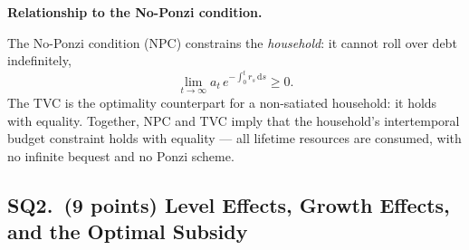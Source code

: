 \documentclass[a4paper,11pt]{article}
\newcommand{\dd}{\mathrm{d}}
\begin{document}
\begin{answerbox}
\textbf{Relationship to the No-Ponzi condition.}

The No-Ponzi condition (NPC) constrains the \emph{household}: it cannot roll over debt indefinitely,
\[
    \lim_{t\to\infty} a_t\,e^{-\int_0^t r_s\,\dd s} \geq 0.
\]
The TVC is the optimality counterpart for a non-satiated household: it holds with equality.  Together, NPC and TVC imply that the household's intertemporal budget constraint holds with equality --- all lifetime resources are consumed, with no infinite bequest and no Ponzi scheme.
\end{answerbox}

\subsection*{SQ2.\ (9 points) Level Effects, Growth Effects, and the Optimal Subsidy}
\end{document}
